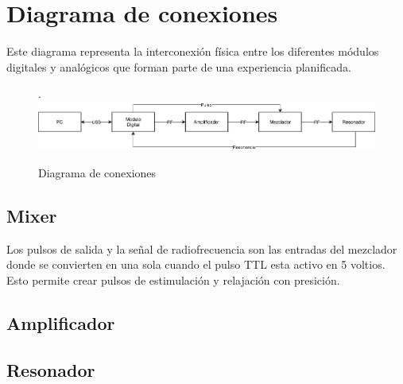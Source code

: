 \section{Diagrama de conexiones}

Este diagrama representa la interconexi\'on f\'isica entre los diferentes m\'odulos digitales y anal\'ogicos que forman
parte de una experiencia planificada.

\begin{figure}[!htb].
    \includegraphics[width=\linewidth]{../figures/d4.jpg}
    \caption{Diagrama de conexiones}
    \label{fig:d4}
\end{figure}
  

\subsection{Mixer}

Los pulsos de salida y la se\~nal de radiofrecuencia son las entradas del mezclador
donde se convierten en una sola cuando el pulso TTL esta activo en 5 voltios.
Esto permite crear pulsos de estimulaci\'on y relajaci\'on con presici\'on.

\subsection{Amplificador}


\subsection{Resonador}



\newpage
